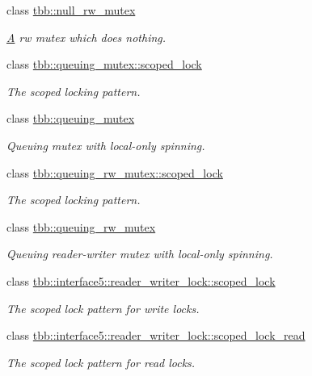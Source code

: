 \begin{DoxyCompactItemize}
class \hyperlink{classtbb_1_1null__rw__mutex}{tbb\+::null\+\_\+rw\+\_\+mutex}
\begin{DoxyCompactList}\small\item\em \hyperlink{structA}{A} rw mutex which does nothing. \end{DoxyCompactList}\item 
class \hyperlink{classtbb_1_1queuing__mutex_1_1scoped__lock}{tbb\+::queuing\+\_\+mutex\+::scoped\+\_\+lock}
\begin{DoxyCompactList}\small\item\em The scoped locking pattern. \end{DoxyCompactList}\item 
class \hyperlink{classtbb_1_1queuing__mutex}{tbb\+::queuing\+\_\+mutex}
\begin{DoxyCompactList}\small\item\em Queuing mutex with local-\/only spinning. \end{DoxyCompactList}\item 
class \hyperlink{classtbb_1_1queuing__rw__mutex_1_1scoped__lock}{tbb\+::queuing\+\_\+rw\+\_\+mutex\+::scoped\+\_\+lock}
\begin{DoxyCompactList}\small\item\em The scoped locking pattern. \end{DoxyCompactList}\item 
class \hyperlink{classtbb_1_1queuing__rw__mutex}{tbb\+::queuing\+\_\+rw\+\_\+mutex}
\begin{DoxyCompactList}\small\item\em Queuing reader-\/writer mutex with local-\/only spinning. \end{DoxyCompactList}\item 
class \hyperlink{classtbb_1_1interface5_1_1reader__writer__lock_1_1scoped__lock}{tbb\+::interface5\+::reader\+\_\+writer\+\_\+lock\+::scoped\+\_\+lock}
\begin{DoxyCompactList}\small\item\em The scoped lock pattern for write locks. \end{DoxyCompactList}\item 
class \hyperlink{classtbb_1_1interface5_1_1reader__writer__lock_1_1scoped__lock__read}{tbb\+::interface5\+::reader\+\_\+writer\+\_\+lock\+::scoped\+\_\+lock\+\_\+read}
\begin{DoxyCompactList}\small\item\em The scoped lock pattern for read locks. \end{DoxyCompactList}\item 

\end{DoxyCompactItemize}
